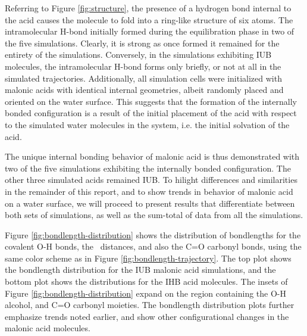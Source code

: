 Referring to Figure \ref{fig:structure}, the presence of a hydrogen bond internal to the acid causes the molecule to fold into a ring-like structure of six atoms. The intramolecular H-bond initially formed during the equilibration phase in two of the five simulations. Clearly, it is strong as once formed it remained for the entirety of the simulations. Conversely, in the simulations exhibiting IUB molecules, the intramolecular H-bond forms only briefly, or not at all in the simulated trajectories. Additionally, all simulation cells were initialized with malonic acids with identical internal geometries, albeit randomly placed and oriented on the water surface. This suggests that the formation of the internally bonded configuration is a result of the initial placement of the acid with respect to the simulated water molecules in the system, i.e. the initial solvation of the acid.

The unique internal bonding behavior of malonic acid is thus demonstrated with two of the five simulations exhibiting the internally bonded configuration. The other three simulated acids remained IUB. To hilight differences and similarities in the remainder of this report, and to show trends in behavior of malonic acid on a water surface, we will proceed to present results that differentiate between both sets of simulations, as well as the sum-total of data from all the simulations.  

Figure \ref{fig:bondlength-distribution} shows the distribution of bondlengths for the covalent O-H bonds, the \ocarbh~distances, and also the C=O carbonyl bonds, using the same color scheme as in Figure \ref{fig:bondlength-trajectory}. The top plot shows the bondlength distribution for the IUB malonic acid simulations, and the bottom plot shows the distributions for the IHB acid molecules. The insets of Figure \ref{fig:bondlength-distribution} expand on the region containing the O-H alcohol, and C=O carbonyl moieties. The bondlength distribution plots further emphasize trends noted earlier, and show other configurational changes in the malonic acid molecules.

